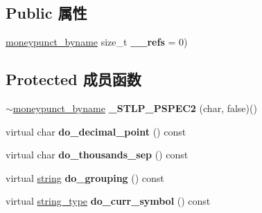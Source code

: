\subsection*{Public 属性}
\begin{DoxyCompactItemize}
\item 
\mbox{\label{classmoneypunct__byname_3_01char_00_01false_01_4_a3af371425eb5d1095c72f606274cd5d1}} 
\hyperlink{classmoneypunct__byname}{moneypunct\+\_\+byname} size\+\_\+t {\bfseries \+\_\+\+\_\+refs} = 0)
\end{DoxyCompactItemize}
\subsection*{Protected 成员函数}
\begin{DoxyCompactItemize}
\item 
\mbox{\label{classmoneypunct__byname_3_01char_00_01false_01_4_acbdaefc92d0a8cbba9ab83ab3528cfc4}} 
$\sim$\hyperlink{classmoneypunct__byname}{moneypunct\+\_\+byname} {\bfseries \+\_\+\+S\+T\+L\+P\+\_\+\+P\+S\+P\+E\+C2} (char, false)()
\item 
\mbox{\label{classmoneypunct__byname_3_01char_00_01false_01_4_a15fd7c44f47473fbc581011234877ff7}} 
virtual char {\bfseries do\+\_\+decimal\+\_\+point} () const
\item 
\mbox{\label{classmoneypunct__byname_3_01char_00_01false_01_4_a0b6e8d6f6a593064f2b9ccd1b6aa27b9}} 
virtual char {\bfseries do\+\_\+thousands\+\_\+sep} () const
\item 
\mbox{\label{classmoneypunct__byname_3_01char_00_01false_01_4_aff3ab0a115bc89c2848adcf97be6c2dc}} 
virtual \hyperlink{structstring}{string} {\bfseries do\+\_\+grouping} () const
\item 
\mbox{\label{classmoneypunct__byname_3_01char_00_01false_01_4_a69829247dffb9fc49bf7ecbd7d0fb915}} 
virtual \hyperlink{structstring}{string\+\_\+type} {\bfseries do\+\_\+curr\+\_\+symbol} () const
\item 

\end{DoxyCompactItemize}
